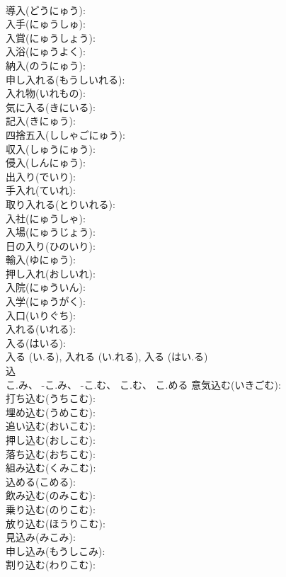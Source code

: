 \documentclass[8pt]{extreport}
\begin{document}
\begin{CJK}{UTF8}{min}
\\	導入(どうにゅう): 
\\	入手(にゅうしゅ): 
\\	入賞(にゅうしょう): 
\\	入浴(にゅうよく): 
\\	納入(のうにゅう): 
\\	申し入れる(もうしいれる): 
\\	入れ物(いれもの): 
\\	気に入る(きにいる): 
\\	記入(きにゅう): 
\\	四捨五入(ししゃごにゅう): 
\\	収入(しゅうにゅう): 
\\	侵入(しんにゅう): 
\\	出入り(でいり): 
\\	手入れ(ていれ): 
\\	取り入れる(とりいれる): 
\\	入社(にゅうしゃ): 
\\	入場(にゅうじょう): 
\\	日の入り(ひのいり): 
\\	輸入(ゆにゅう): 
\\	押し入れ(おしいれ): 
\\	入院(にゅういん): 
\\	入学(にゅうがく): 
\\	入口(いりぐち): 
\\	入れる(いれる): 
\\	入る(はいる): 
\\	入る (い.る), 入れる (い.れる), 入る (はい.る)
\\	込			
\\	こ.み、 -こ.み、 -こ.む、 こ.む、 こ.める	意気込む(いきごむ): 
\\	打ち込む(うちこむ): 
\\	埋め込む(うめこむ): 
\\	追い込む(おいこむ): 
\\	押し込む(おしこむ): 
\\	落ち込む(おちこむ): 
\\	組み込む(くみこむ): 
\\	込める(こめる): 
\\	飲み込む(のみこむ): 
\\	乗り込む(のりこむ): 
\\	放り込む(ほうりこむ): 
\\	見込み(みこみ): 
\\	申し込み(もうしこみ): 
\\	割り込む(わりこむ): 

\end{CJK}
\end{document}
